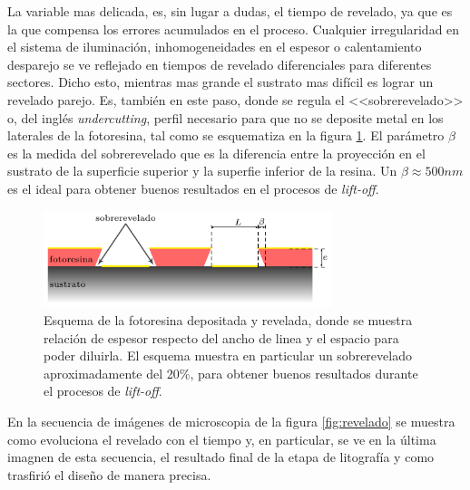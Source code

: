 { 		   La variable mas delicada, es, sin lugar a dudas, el tiempo de revelado, ya que es la que compensa los errores acumulados en el proceso. Cualquier irregularidad en el sistema de iluminación, inhomogeneidades en el espesor o calentamiento desparejo se ve reflejado en tiempos de revelado diferenciales para diferentes sectores. Dicho esto, mientras mas grande el sustrato mas difícil es lograr un revelado parejo. Es, también en este paso, donde se regula el <<sobrerevelado>> o, del inglés \textit{undercutting}, perfil necesario para que no se deposite metal en los laterales de la fotoresina, tal como se esquematiza en la figura \ref{fig:undercut}. El parámetro $\beta$ es la medida del sobrerevelado que es la diferencia entre la proyección en el sustrato de la superficie superior y la superfie inferior de la resina. Un $\beta \approx 500nm$ es el ideal para obtener buenos resultados en el procesos de \textit{lift-off}. 

 				\begin{figure}[ht!]
 				\centering
 				\includegraphics[width=0.75\textwidth]{Esquemas/altura-ancho.pdf}
 				\caption[Perfil de fotorresina para el decapado o\textit{ lift-off}]{Esquema de la fotoresina depositada y revelada, donde se muestra relación de espesor respecto del ancho de linea y el espacio para poder diluirla. El esquema muestra en particular un sobrerevelado aproximadamente del 20\%, para obtener buenos resultados durante el procesos de\textit{ lift-off}.}
 				\label{fig:undercut}
 				\end{figure}

 		    En la secuencia de imágenes de microscopia de la figura \ref{fig:revelado} se muestra como evoluciona el revelado con el tiempo y, en particular, se ve en la última imagnen de esta secuencia, el resultado final de la etapa de litografía y como trasfirió el diseño de manera precisa.

}

